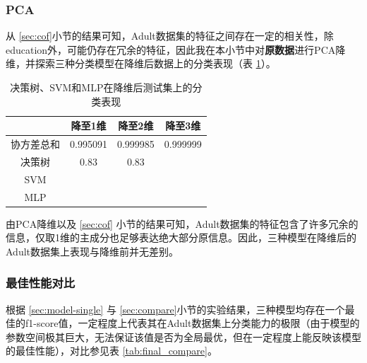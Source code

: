 \documentclass[12pt,a4paper]{article}
\theoremstyle{definition}
\begin{document}
\subsubsection{PCA}

从 \ref{sec:cof}小节的结果可知，Adult数据集的特征之间存在一定的相关性，除education外，可能仍存在冗余的特征，因此我在本小节中对\textbf{原数据}进行PCA降维，并探索三种分类模型在降维后数据上的分类表现（表 \ref{tab:pca1}）。

\begin{table}[H]
	\renewcommand\arraystretch{1.35}
	\caption{决策树、SVM和MLP在降维后测试集上的分类表现}
	\label{tab:pca1}
	\centering
	
	\begin{tabular}{c|c|c|c}
		\centering
		 & 降至1维 & 降至2维 & 降至3维 \\
		\hline
		\hline
		
		协方差总和 & 0.995091 & 0.999985 & 0.999999 \\
		决策树 & 0.83 & 0.83 & \\
		SVM & & & \\
		MLP & & & \\

	\end{tabular}
\end{table}

由PCA降维以及 \ref{sec:cof} 小节的结果可知，Adult数据集的特征包含了许多冗余的信息，仅取1维的主成分也足够表达绝大部分原信息。因此，三种模型在降维后的Adult数据集上表现与降维前并无差别。


\subsubsection{最佳性能对比}

根据 \ref{sec:model-single} 与 \ref{sec:compare}小节的实验结果，三种模型均存在一个最佳的f1-score值，一定程度上代表其在Adult数据集上分类能力的极限（由于模型的参数空间极其巨大，无法保证该值是否为全局最优，但在一定程度上能反映该模型的最佳性能），对比参见表 \ref{tab:final_compare}。
\end{document}
